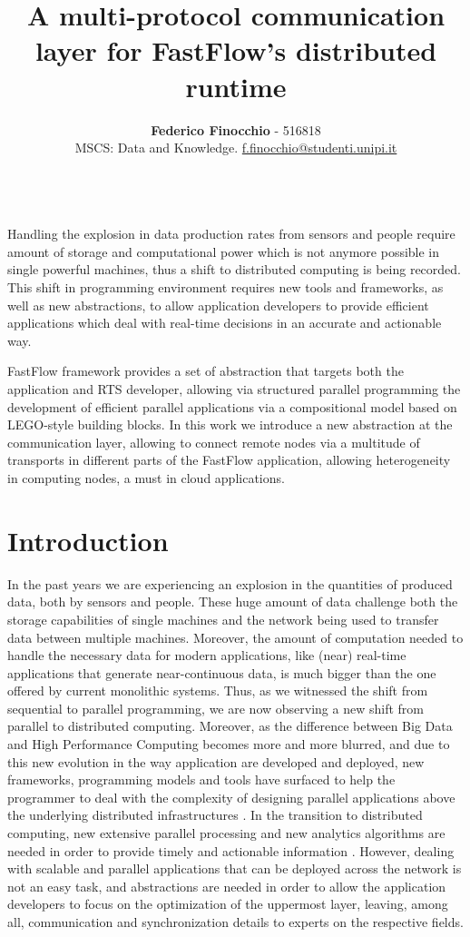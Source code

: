 \documentclass[12pt, oneside]{report}
\title{\vspace{-2cm}\textbf{A multi-protocol communication layer for FastFlow's distributed runtime}}
\author{
    \normalsize{\textbf{Federico Finocchio} - 516818}\\
    \normalsize{MSCS: Data and Knowledge. \underline{f.finocchio@studenti.unipi.it}}\\\\
}
\makeatletter
\renewenvironment{abstract}{%
    \if@twocolumn
      \section*{\abstractname}%
    \else %
      \begin{center}%
        {\bfseries \normalsize\abstractname\vspace{\z@}}%
      \end{center}%
      \quotation
    \fi}
    {\if@twocolumn\else\endquotation\fi}
\makeatother
\begin{document}
\date{}
\maketitle
    
\begin{abstract}
\normalsize
Handling the explosion in data production rates from sensors and people require amount of storage and computational power which is not anymore possible in single powerful machines, thus a shift to distributed computing is being recorded. This shift in programming environment requires new tools and frameworks, as well as new abstractions, to allow application developers to provide efficient applications which deal with real-time decisions in an accurate and actionable way.

FastFlow framework provides a set of abstraction that targets both the application and RTS developer, allowing via structured parallel programming the development of efficient parallel applications via a compositional model based on LEGO-style building blocks. In this work we introduce a new abstraction at the communication layer, allowing to connect remote nodes via a multitude of transports in different parts of the FastFlow application, allowing heterogeneity in computing nodes, a must in cloud applications.
\end{abstract}
\tableofcontents
\newpage
\chapter*{Introduction}
\label{introduction}
In the past years we are experiencing an explosion in the quantities of produced data, both by sensors and people. These huge amount of data challenge both the storage capabilities of single machines and the network being used to transfer data between multiple machines. Moreover, the amount of computation needed to handle the necessary data for modern applications, like (near) real-time applications that generate near-continuous data, is much bigger than the one offered by current monolithic systems. Thus, as we witnessed the shift from sequential to parallel programming, we are now observing a new shift from parallel to distributed computing. Moreover, as the difference between Big Data and High Performance Computing becomes more and more blurred, and due to this new evolution in the way application are developed and deployed, new frameworks, programming models and tools have surfaced to help the programmer to deal with the complexity of designing parallel applications above the underlying distributed infrastructures \cite{survey-distributed}. In the transition to distributed computing, new extensive parallel processing and new analytics algorithms are needed in order to provide timely and actionable information \cite{big-data-movingforward}. However, dealing with scalable and parallel applications that can be deployed across the network is not an easy task, and abstractions are needed in order to allow the application developers to focus on the optimization of the uppermost layer, leaving, among all, communication and synchronization details to experts on the respective fields.
\end{document}
